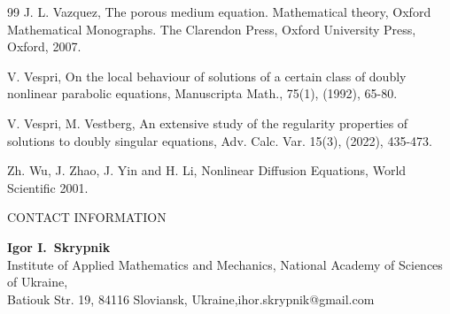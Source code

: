 \documentclass[a4paper,11pt,fullpage]{article}
\numberwithin{equation}{section}
\begin{document}
\begin{thebibliography}{99}
J. L. Vazquez, The porous medium equation. Mathematical theory, Oxford Mathematical Monographs. The
 Clarendon Press, Oxford University Press, Oxford, 2007.
 
V. Vespri, On the local behaviour of solutions of a certain class of doubly nonlinear parabolic
equations, Manuscripta Math., 75(1), (1992), 65-80. 
 
 V. Vespri, M. Vestberg, An extensive study of the regularity properties of solutions to doubly singular
 equations, Adv. Calc. Var. 15(3),  (2022),  435-473.

 Zh. Wu, J. Zhao, J. Yin and H. Li, Nonlinear Diffusion Equations, World Scientific 2001. 

\end{thebibliography}


\bigskip

CONTACT INFORMATION


\medskip
\textbf{Igor I.~Skrypnik}\\Institute of Applied Mathematics and Mechanics,
National Academy of Sciences of Ukraine, \\ \indent Batiouk Str. 19, 84116 Sloviansk, Ukraine,\quad ihor.skrypnik@gmail.com
\end{document}
